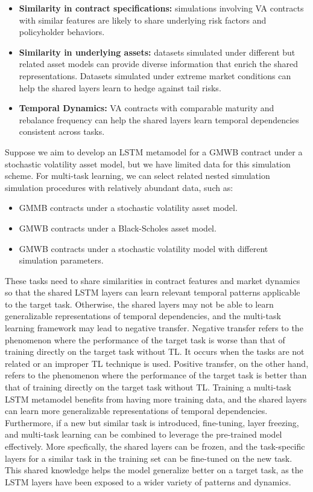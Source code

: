 \begin{itemize} 
    \item   \textbf{Similarity in contract specifications:} 
            simulations involving VA contracts with similar features are likely to share underlying risk factors and policyholder behaviors. 
    \item   \textbf{Similarity in underlying assets:} 
            datasets simulated under different but related asset models can provide diverse information that enrich the shared representations.
            Datasets simulated under extreme market conditions can help the shared layers learn to hedge against tail risks.
    \item   \textbf{Temporal Dynamics:} 
            VA contracts with comparable maturity and rebalance frequency can help the shared layers learn temporal dependencies consistent across tasks. 
\end{itemize}

Suppose we aim to develop an LSTM metamodel for a GMWB contract under a stochastic volatility asset model, but we have limited data for this simulation scheme. 
For multi-task learning, we can select related nested simulation simulation procedures with relatively abundant data, such as:

\begin{itemize} 
    \item GMMB contracts under a stochastic volatility asset model. 
    \item GMWB contracts under a Black-Scholes asset model. 
    \item GMWB contracts under a stochastic volatility model with different simulation parameters.
\end{itemize}

These tasks need to share similarities in contract features and market dynamics so that the shared LSTM layers can learn relevant temporal patterns applicable to the target task.
Otherwise, the shared layers may not be able to learn generalizable representations of temporal dependencies, and the multi-task learning framework may lead to negative transfer.
Negative transfer refers to the phenomenon where the performance of the target task is worse than that of training directly on the target task without TL.
It occurs when the tasks are not related or an improper TL technique is used.
Positive transfer, on the other hand, refers to the phenomenon where the performance of the target task is better than that of training directly on the target task without TL.
Training a multi-task LSTM metamodel benefits from having more training data, and the shared layers can learn more generalizable representations of temporal dependencies.
Furthermore, if a new but similar task is introduced, fine-tuning, layer freezing, and multi-task learning can be combined to leverage the pre-trained model effectively.
More specfically, the shared layers can be frozen, and the task-specific layers for a similar task in the training set can be fine-tuned on the new task.
This shared knowledge helps the model generalize better on a target task, as the LSTM layers have been exposed to a wider variety of patterns and dynamics.

